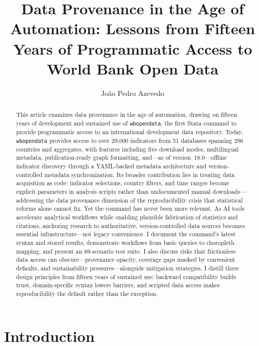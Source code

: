 \documentclass[bib]{statapress}
\title[Data Provenance in the Age of Automation]{Data Provenance in the Age of Automation: Lessons from Fifteen Years of Programmatic Access to World Bank Open Data}
\author{Jo\~{a}o Pedro Azevedo}{%
Jo\~{a}o Pedro Azevedo\\
jpazvd.github.io%
}
\begin{document}
\maketitle

\begin{abstract}
This article examines data provenance in the age of automation, drawing on fifteen years of development and sustained use of \texttt{wbopendata}, the first Stata command to provide programmatic access to an international development data
repository. Today, \texttt{wbopendata} provides access to over 29{,}000 indicators from 51 databases spanning 296 countries and aggregates, with features including five download modes, multilingual metadata, publication-ready graph formatting, and---as of version~18.0---offline indicator discovery through a YAML-backed metadata architecture and version-controlled metadata synchronization. Its broader contribution lies in treating data acquisition as code: indicator selections, country filters, and time ranges become explicit parameters in analysis scripts rather than undocumented manual downloads---addressing the data provenance dimension of the reproducibility crisis that statistical reforms alone cannot fix. Yet the command has never been more relevant. As AI tools accelerate analytical workflows while enabling plausible fabrication of statistics and citations, anchoring research to authoritative, version-controlled data sources becomes essential infrastructure---not legacy convenience. I document the command's latest syntax and stored results, demonstrate workflows from basic queries to choropleth mapping, and present an 89-scenario test suite. I also discuss risks that frictionless data access can obscure---provenance opacity, coverage gaps masked by convenient defaults, and sustainability pressures---alongside mitigation strategies. I distill three design principles from fifteen years of sustained use: backward compatibility builds trust, domain-specific syntax lowers barriers, and scripted data access makes reproducibility the default rather than the exception.

\end{abstract}


\section{Introduction}\label{sec:intro}
\end{document}
